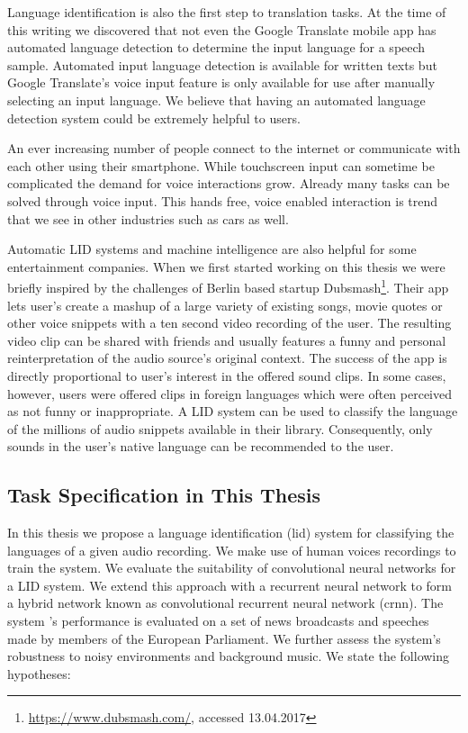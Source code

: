 Language identification is also the first step to translation tasks. At the time of this writing we discovered that not even the Google Translate mobile app has automated language detection to determine the input language for a speech sample. Automated input language detection is available for written texts but Google Translate's voice input feature is only available for use after manually selecting an input language. We believe that having an automated language detection system could be extremely helpful to users. 

An ever increasing number of people connect to the internet or communicate with each other using their smartphone. While touchscreen input can sometime be complicated the demand for voice interactions grow. Already many tasks can be solved through voice input. This hands free, voice enabled interaction is trend that we see in other industries such as cars as well.

Automatic LID systems and machine intelligence are also helpful for some entertainment companies. When we first started working on this thesis we were briefly inspired by the challenges of Berlin based startup Dubsmash\footnote{\url{https://www.dubsmash.com/}, accessed 13.04.2017}. Their app lets user's create a mashup of a large variety of existing songs, movie quotes or other voice snippets with a ten second video recording of the user. The resulting video clip can be shared with friends and usually features a funny and personal reinterpretation of the audio source's original context. The success of the app is directly proportional to user's interest in the offered sound clips. In some cases, however, users were offered clips in foreign languages which were often perceived as not funny or inappropriate. A LID system can be used to classify the language of the millions of audio snippets available in their library. Consequently, only sounds in the user's native language can be recommended to the user.


\subsection{Task Specification in This Thesis}
In this thesis we propose a language identification (\ac{lid}) system for classifying the languages of a given audio recording. We make use of human voices recordings to train the  system. We evaluate the suitability of convolutional neural networks for a LID system. We extend this approach with a recurrent neural network to form a hybrid network known as convolutional recurrent neural network (\ac{crnn}). The system 's performance is evaluated on a set of news broadcasts and speeches made by members of the European Parliament. We further assess the system's robustness to noisy environments and background music. We state the following hypotheses:

